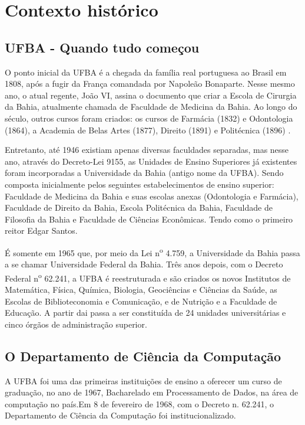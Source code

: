 \chapter{Contexto histórico}

\section{UFBA - Quando tudo começou}
O ponto inicial da UFBA é a chegada da família real portuguesa 
ao Brasil em 1808, após a fugir da França comandada por Napoleão Bonaparte. 
Nesse mesmo ano, o atual regente, João VI, 
assina o documento que criar a Escola de Cirurgia da Bahia, 
atualmente chamada de Faculdade de Medicina da Bahia.  
Ao longo do século, outros cursos foram criados:
os cursos de Farmácia (1832) e Odontologia (1864), 
a Academia de Belas Artes (1877), 
Direito (1891) e Politécnica (1896) \cite{portal_ufba}.


Entretanto, até 1946 existiam apenas diversas faculdades separadas, 
mas nesse ano, através do Decreto-Lei 9155, 
as Unidades de Ensino Superiores já existentes foram 
incorporadas a Universidade da Bahia (antigo nome da UFBA). 
Sendo composta inicialmente pelos seguintes estabelecimentos 
de ensino superior: 
Faculdade de Medicina da Bahia e suas escolas anexas (Odontologia e Farmácia), 
Faculdade de Direito da Bahia, Escola Politécnica da Bahia,
Faculdade de Filosofia da Bahia e 
Faculdade de Ciências Econômicas. 
Tendo como o primeiro reitor Edgar Santos. 
  
É somente em 1965 que, por meio da Lei n\textsuperscript{o} 4.759, 
a Universidade da Bahia passa a se chamar 
Universidade Federal da Bahia. Três anos depois, com o  Decreto Federal n\textsuperscript{o} 62.241, a UFBA é reestruturada e são criados os novos Institutos de Matemática, Física, Química, Biologia, Geociências e Ciências da Saúde, as Escolas de Biblioteconomia e Comunicação, e de Nutrição e a Faculdade de Educação. A partir dai passa a ser constituída de 24 unidades universitárias e cinco órgãos de administração superior.

\section{O Departamento de Ciência da Computação}

A UFBA foi uma das primeiras instituições de ensino a oferecer um curso de graduação, no ano de 1967,  Bacharelado em Processamento de Dados, na área de computação no país.Em 8 de fevereiro de 1968, com o Decreto n. 62.241, o Departamento de Ciência da Computação foi institucionalizado.
 
